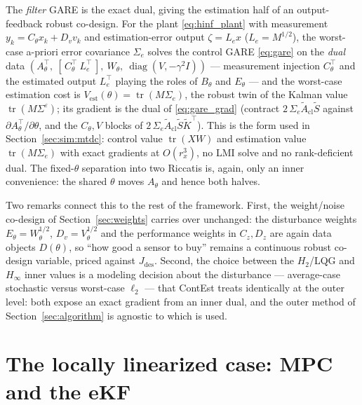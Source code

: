 \documentclass[twocolumn,amsthm]{autart}
\begin{document}
The \emph{filter} GARE is the exact dual, giving the estimation half of an
output-feedback robust co-design. For the plant \eqref{eq:hinf_plant} with
measurement $y_k=C_\theta x_k+D_v v_k$ and estimation-error output $\zeta=L_e x$
($L_e=M^{1/2}$), the worst-case a-priori error covariance $\Sigma_e$ solves the
control GARE \eqref{eq:gare} on the \emph{dual} data
$(A_\theta^\top,\ [\,C_\theta^\top\ L_e^\top\,],\ W_\theta,\ \operatorname{diag}(V,-\gamma^2 I))$
--- measurement injection $C_\theta^\top$ and the estimated output $L_e^\top$
playing the roles of $B_\theta$ and $E_\theta$ --- and the worst-case estimation
cost is $V_{\mathrm{est}}(\theta)=\operatorname{tr}(M\Sigma_e)$, the robust twin of
the Kalman value $\operatorname{tr}(M\Sigma^\varepsilon)$; its gradient is the dual
of \eqref{eq:gare_grad} (contract $2\,\Sigma_e\tilde A_{\mathrm{cl}}\tilde S$ against
$\partial A_\theta^\top/\partial\theta$, and the $C_\theta,V$ blocks of
$2\,\Sigma_e\tilde A_{\mathrm{cl}}\tilde S\tilde K^\top$). This is the form used in
Section~\ref{sec:sim:mtdc}: control value $\operatorname{tr}(XW)$ and estimation
value $\operatorname{tr}(M\Sigma_e)$ with exact gradients at $O(r_x^3)$, no LMI solve
and no rank-deficient dual. The fixed-$\theta$ separation into two Riccatis is,
again, only an inner convenience: the shared $\theta$ moves $A_\theta$ and hence
both halves.

Two remarks connect this to the rest of the framework. First, the weight/noise
co-design of Section~\ref{sec:weights} carries over unchanged: the disturbance
weights $E_\theta = W_\theta^{1/2}$, $D_v = V_\theta^{1/2}$ and the performance
weights in $C_z, D_z$ are again data objects $D(\theta)$, so ``how good a sensor
to buy'' remains a continuous robust co-design variable, priced against
$J_{\mathrm{des}}$. Second, the choice between the $H_2$/LQG and $H_\infty$ inner
values is a modeling decision about the disturbance --- average-case stochastic
versus worst-case $\ell_2$ --- that ContEst treats identically at the outer level:
both expose an exact gradient from an inner dual, and the outer method of
Section~\ref{sec:algorithm} is agnostic to which is used.

\section{The locally linearized case: MPC and the eKF}\label{sec:ekf}
\end{document}
